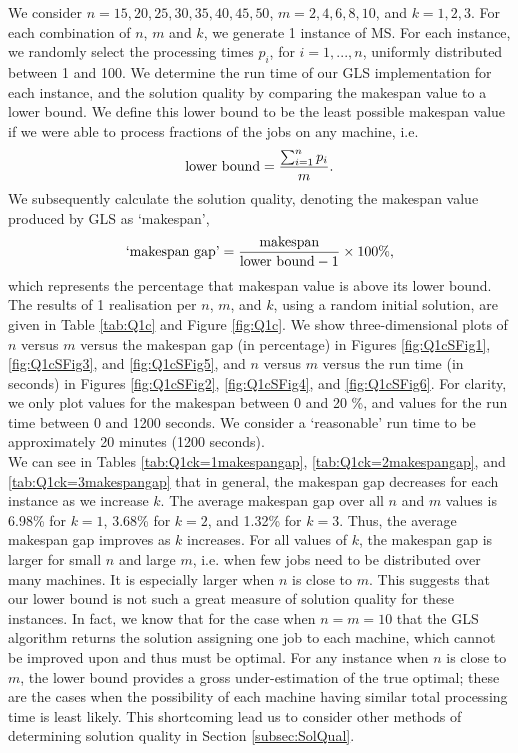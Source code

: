 \documentclass[12pt,a4paper,reqno]{article}
\begin{document}
We consider $n=15, 20, 25, 30, 35, 40, 45, 50$, $m=2,4,6,8,10$, and $k=1,2,3$. For each combination of $n$, $m$ and $k$, we generate 1 instance of MS. For each instance, we randomly select the processing times $p_i$, for $i=1,...,n$, uniformly distributed between 1 and 100. We determine the run time of our GLS implementation for each instance, and the solution quality by comparing the makespan value to a lower bound. We define this lower bound to be the least possible makespan value if we were able to process fractions of the jobs on any machine, i.e.
\begin{equation}
\textnormal{lower bound} = \frac{\sum_{i=1}^n p_i}{m}. \label{eq:NaiveLB}
\end{equation}
We subsequently calculate the solution quality, denoting the makespan value produced by GLS as `makespan',
\begin{equation}
\textnormal{`makespan gap'} = \frac{\textnormal{makespan}}{\textnormal{lower bound} - 1} \times 100\%, \label{eq:NaiveMakespanGap}
\end{equation}
which represents the percentage that makespan value is above its lower bound. \\

The results of 1 realisation per $n$, $m$, and $k$, using a random initial solution, are given in Table \ref{tab:Q1c} and Figure \ref{fig:Q1c}.
We show three-dimensional plots of $n$ versus $m$ versus the makespan gap (in percentage) in Figures \ref{fig:Q1cSFig1}, \ref{fig:Q1cSFig3}, and \ref{fig:Q1cSFig5}, and $n$ versus $m$ versus the run time (in seconds) in Figures \ref{fig:Q1cSFig2}, \ref{fig:Q1cSFig4}, and \ref{fig:Q1cSFig6}. For clarity, we only plot values for the makespan between 0 and 20 \%, and values for the run time between 0 and 1200 seconds. We consider a `reasonable' run time to be approximately 20 minutes (1200 seconds). \\

We can see in Tables \ref{tab:Q1ck=1makespangap}, \ref{tab:Q1ck=2makespangap}, and \ref{tab:Q1ck=3makespangap} that in general, the makespan gap decreases for each instance as we increase $k$. The average makespan gap over all $n$ and $m$ values is 6.98\% for $k=1$, 3.68\% for $k=2$, and 1.32\% for $k=3$. Thus, the average makespan gap improves as $k$ increases. For all values of $k$, the makespan gap is larger for small $n$ and large $m$, i.e. when few jobs need to be distributed over many machines. It is especially larger when $n$ is close to $m$. This suggests that our lower bound is not such a great measure of solution quality for these instances. In fact, we know that for the case when $n=m=10$ that the GLS algorithm returns the solution assigning one job to each machine, which cannot be improved upon and thus must be optimal. For any instance when $n$ is close to $m$, the lower bound provides a gross under-estimation of the true optimal; these are the cases when the possibility of each machine having similar total processing time is least likely. This shortcoming lead us to consider other methods of determining solution quality in Section \ref{subsec:SolQual}. \\
\end{document}
